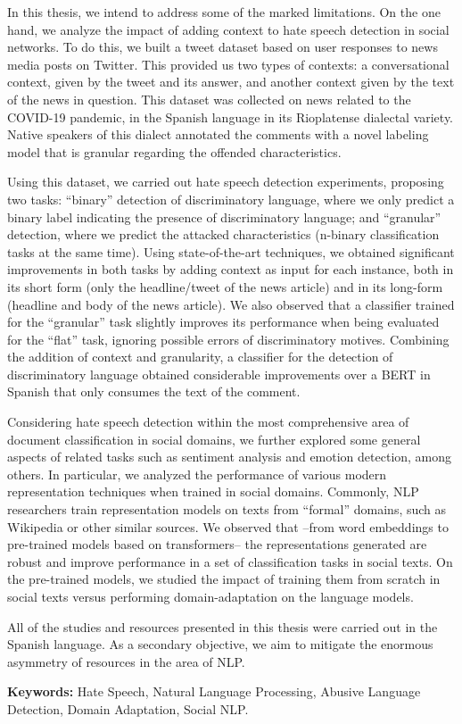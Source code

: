 {In this thesis, we intend to address some of the marked limitations. On the one hand, we analyze the impact of adding context to hate speech detection in social networks. To do this, we built a tweet dataset based on user responses to news media posts on Twitter. This provided us two types of contexts: a conversational context, given by the tweet and its answer, and another context given by the text of the news in question. This dataset was collected on news related to the COVID-19 pandemic, in the Spanish language in its Rioplatense dialectal variety. Native speakers of this dialect annotated the comments with a novel labeling model that is granular regarding the offended characteristics.

Using this dataset, we carried out hate speech detection experiments, proposing two tasks: ``binary'' detection of discriminatory language, where we only predict a binary label indicating the presence of discriminatory language; and ``granular'' detection, where we predict the attacked characteristics (n-binary classification tasks at the same time). Using state-of-the-art techniques, we obtained significant improvements in both tasks by adding context as input for each instance, both in its short form (only the headline/tweet of the news article) and in its long-form (headline and body of the news article). We also observed that a classifier trained for the ``granular'' task slightly improves its performance when being evaluated for the ``flat'' task, ignoring possible errors of discriminatory motives. Combining the addition of context and granularity, a classifier for the detection of discriminatory language obtained considerable improvements over a BERT in Spanish that only consumes the text of the comment.

Considering hate speech detection within the most comprehensive area of ​​document classification in social domains, we further explored  some general aspects of related tasks such as sentiment analysis and emotion detection, among others. In particular, we analyzed the performance of various modern representation techniques when trained in social domains. Commonly, NLP researchers train representation models on texts from ``formal'' domains, such as Wikipedia or other similar sources. We observed that –from word embeddings to pre-trained models based on transformers– the representations generated are robust and improve performance in a set of classification tasks in social texts. On the pre-trained models, we studied the impact of training them from scratch in social texts versus performing domain-adaptation on the language models.

All of the studies and resources presented in this thesis were carried out in the Spanish language. As a secondary objective, we aim to mitigate the enormous asymmetry of resources in the area of NLP.
}
\bigskip

\noindent\textbf{Keywords:} Hate Speech, Natural Language Processing, Abusive Language Detection, Domain Adaptation, Social NLP.